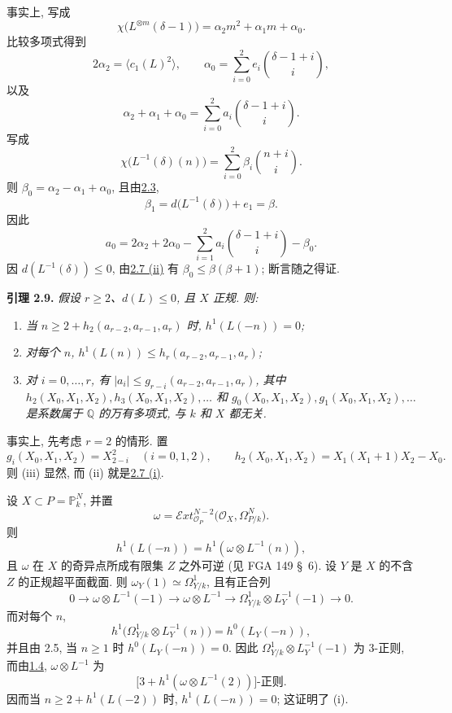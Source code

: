 事实上, 写成
\[
\chi\bigl(L^{\otimes m}(\delta-1)\bigr)
=\alpha_2m^2+\alpha_1m+\alpha_0.
\]
比较多项式得到
\[
2\alpha_2=\bigl\langle c_1(L)^2\bigr\rangle,
\qquad
\alpha_0=\sum_{i=0}^{2}e_i\binom{\delta-1+i}{i},
\]
以及
\[
\alpha_2+\alpha_1+\alpha_0
=\sum_{i=0}^{2}a_i\binom{\delta-1+i}{i}.
\]
写成
\[
\chi\bigl(L^{-1}(\delta)(n)\bigr)
=\sum_{i=0}^{2}\beta_i\binom{n+i}{i}.
\]
则 \(\beta_0=\alpha_2-\alpha_1+\alpha_0\), 且由\hyperlink{sga6.e13.lem.2-3}{2.3},
\[
\beta_1=d\bigl(L^{-1}(\delta)\bigr)+e_1=\beta.
\]
因此
\[
a_0=2\alpha_2+2\alpha_0
-\sum_{i=1}^{2}a_i\binom{\delta-1+i}{i}-\beta_0.
\]
因 \(d(L^{-1}(\delta))\le0\), 由\hyperlink{sga6.e13.lem.2-6}{2.7 (ii)} 有 \(\beta_0\le\beta(\beta+1)\); 断言随之得证.

\textbf{引理 2.9.} \emph{假设 \(r\ge2\)、\(d(L)\le0\), 且 \(X\) 正规. 则:}
\begin{enumerate}[label=(\roman*)]
\item \emph{当 \(n\ge2+h_2(a_{r-2},a_{r-1},a_r)\) 时, \(h^1(L(-n))=0\);}
\item \emph{对每个 \(n\), \(h^1(L(n))\le h_r(a_{r-2},a_{r-1},a_r)\);}
\item \emph{对 \(i=0,\ldots,r\), 有 \(|a_i|\le g_{r-i}(a_{r-2},a_{r-1},a_r)\), 其中 \(h_2(X_0,X_1,X_2),\allowbreak h_3(X_0,X_1,X_2),\allowbreak\ldots\) 和 \(g_0(X_0,X_1,X_2),\allowbreak g_1(X_0,X_1,X_2),\allowbreak\ldots\) 是系数属于 \(\mathbb Q\) 的万有多项式, 与 \(k\) 和 \(X\) 都无关.}
\end{enumerate}

事实上, 先考虑 \(r=2\) 的情形. 置
\[
g_i(X_0,X_1,X_2)=X_{2-i}^2\quad(i=0,1,2),
\qquad
h_2(X_0,X_1,X_2)=X_1(X_1+1)X_2-X_0.
\]
则 (iii) 显然, 而 (ii) 就是\hyperlink{sga6.e13.lem.2-6}{2.7 (i)}.

设 \(X\subset P=\mathbb P_k^N\), 并置
\[
\omega=
\mathcal E\!xt_{\mathcal O_P}^{N-2}
\bigl(\mathcal O_X,\Omega^N_{P/k}\bigr).
\]
则
\[
h^1(L(-n))=h^1(\omega\otimes L^{-1}(n)),
\]
且 \(\omega\) 在 \(X\) 的奇异点所成有限集 \(Z\) 之外可逆 (见 FGA 149 \S~6). 设 \(Y\) 是 \(X\) 的不含 \(Z\) 的正规超平面截面. 则 \(\omega_Y(1)\simeq\Omega^1_{Y/k}\), 且有正合列
\[
0\longrightarrow\omega\otimes L^{-1}(-1)
\longrightarrow\omega\otimes L^{-1}
\longrightarrow\Omega^1_{Y/k}\otimes L_Y^{-1}(-1)
\longrightarrow0.
\]
而对每个 \(n\),
\[
h^1\bigl(\Omega^1_{Y/k}\otimes L_Y^{-1}(n)\bigr)
=h^0(L_Y(-n)),
\]
并且由 2.5, 当 \(n\ge1\) 时 \(h^0(L_Y(-n))=0\). 因此 \(\Omega^1_{Y/k}\otimes L_Y^{-1}(-1)\) 为 3-正则, 而由\hyperlink{sga6.e13.prop.1-4}{1.4}, \(\omega\otimes L^{-1}\) 为
\[
\bigl[3+h^1(\omega\otimes L^{-1}(2))\bigr]\text{-正则}.
\]
因而当 \(n\ge2+h^1(L(-2))\) 时, \(h^1(L(-n))=0\); 这证明了 (i).

